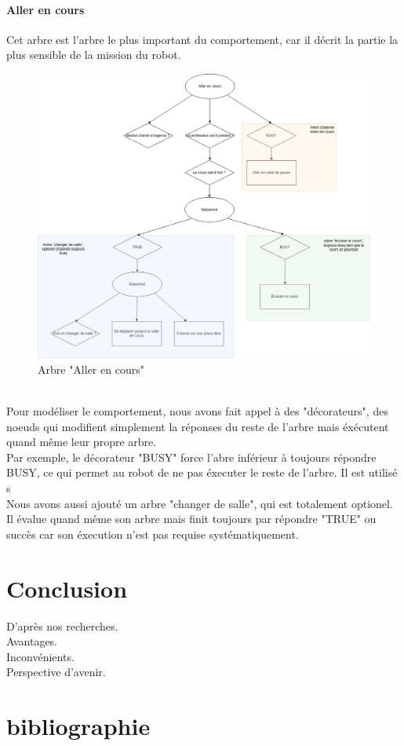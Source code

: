 \documentclass[titlepage]{article}
\begin{document}
	\paragraph{Aller en cours}
	Cet arbre est l'arbre le plus important du comportement, car il décrit la partie la plus sensible de la mission du robot.
	\begin{figure}[h!]
		\centering
		\includegraphics[width=\linewidth]{img/BT_5.png}
		\caption{Arbre "Aller en cours"}
		\label{fig:exemple_4}
	\end{figure}
	\\
	Pour modéliser le comportement, nous avons fait appel à des "décorateurs", des noeuds qui modifient simplement la réponses du reste de l'arbre mais éxécutent quand même leur propre arbre. 
	\\
	Par exemple, le décorateur "BUSY" force l'abre inférieur à toujours répondre BUSY, ce qui permet au robot de ne pas éxecuter le reste de l'arbre. Il est utilisé s
	\\
	Nous avons aussi ajouté un arbre "changer de salle", qui est totalement optionel. Il  évalue quand même son arbre mais finit toujours par répondre "TRUE" ou succès car son éxecution n'est pas requise systématiquement.
	\clearpage
	\section{Conclusion}
	D'après nos recherches.
	\\
	Avantages. 
	\\
	Inconvénients.
	\\
	Perspective d'avenir.
	\clearpage
	\section{bibliographie}
	
	
\end{document}

